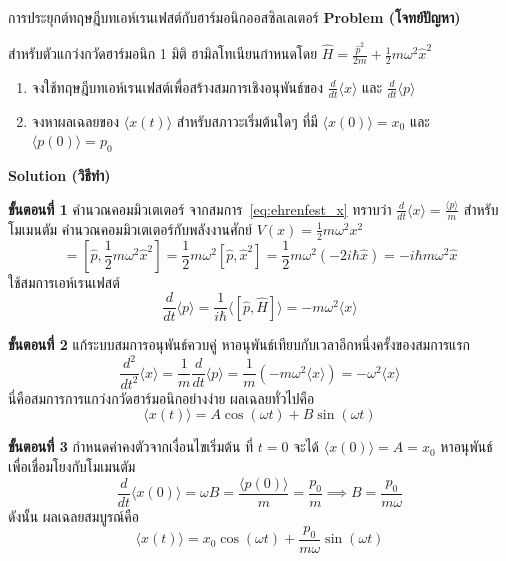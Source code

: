 \begin{psctbox}{การประยุกต์ทฤษฎีบทเอห์เรนเฟสต์กับฮาร์มอนิกออสซิลเลเตอร์}
\textbf{Problem (โจทย์ปัญหา)}

สำหรับตัวแกว่งกวัดฮาร์มอนิก 1 มิติ ฮามิลโทเนียนกำหนดโดย $\hat{H} = \frac{\hat{p}^2}{2m} + \frac{1}{2}m\omega^2 \hat{x}^2$
\begin{enumerate}
    \item จงใช้ทฤษฎีบทเอห์เรนเฟสต์เพื่อสร้างสมการเชิงอนุพันธ์ของ $\frac{d}{dt}\langle x \rangle$ และ $\frac{d}{dt}\langle p \rangle$
    \item จงหาผลเฉลยของ $\langle x(t) \rangle$ สำหรับสภาวะเริ่มต้นใดๆ ที่มี $\langle x(0) \rangle = x_0$ และ $\langle p(0) \rangle = p_0$
\end{enumerate}

\textbf{Solution (วิธีทำ)}

\textbf{ขั้นตอนที่ 1} คำนวณคอมมิวเตเตอร์
จากสมการ~\eqref{eq:ehrenfest_x} ทราบว่า $\frac{d}{dt}\langle x \rangle = \frac{\langle p \rangle}{m}$
สำหรับโมเมนตัม คำนวณคอมมิวเตเตอร์กับพลังงานศักย์ $V(x) = \frac{1}{2}m\omega^2 x^2$
\begin{equation*}
[\hat{p}, \hat{H}] = \left[ \hat{p}, \frac{1}{2}m\omega^2 \hat{x}^2 \right] = \frac{1}{2}m\omega^2 [\hat{p}, \hat{x}^2] = \frac{1}{2}m\omega^2 (-2i\hbar \hat{x}) = -i\hbar m\omega^2 \hat{x}
\end{equation*}
ใช้สมการเอห์เรนเฟสต์
\begin{equation*}
\frac{d}{dt}\langle p \rangle = \frac{1}{i\hbar}\langle [\hat{p}, \hat{H}] \rangle = -m\omega^2 \langle x \rangle
\end{equation*}

\textbf{ขั้นตอนที่ 2} แก้ระบบสมการอนุพันธ์ควบคู่
หาอนุพันธ์เทียบกับเวลาอีกหนึ่งครั้งของสมการแรก
\begin{equation*}
\frac{d^2}{dt^2}\langle x \rangle = \frac{1}{m}\frac{d}{dt}\langle p \rangle = \frac{1}{m}(-m\omega^2 \langle x \rangle) = -\omega^2 \langle x \rangle
\end{equation*}
นี่คือสมการการแกว่งกวัดฮาร์มอนิกอย่างง่าย ผลเฉลยทั่วไปคือ
\begin{equation*}
\langle x(t) \rangle = A \cos(\omega t) + B \sin(\omega t)
\end{equation*}

\textbf{ขั้นตอนที่ 3} กำหนดค่าคงตัวจากเงื่อนไขเริ่มต้น
ที่ $t = 0$ จะได้ $\langle x(0) \rangle = A = x_0$
หาอนุพันธ์เพื่อเชื่อมโยงกับโมเมนตัม
\begin{equation*}
\frac{d}{dt}\langle x(0) \rangle = \omega B = \frac{\langle p(0) \rangle}{m} = \frac{p_0}{m} \implies B = \frac{p_0}{m\omega}
\end{equation*}
ดังนั้น ผลเฉลยสมบูรณ์คือ
\begin{equation*}
\langle x(t) \rangle = x_0 \cos(\omega t) + \frac{p_0}{m\omega}\sin(\omega t)
\end{equation*}


\end{psctbox}
